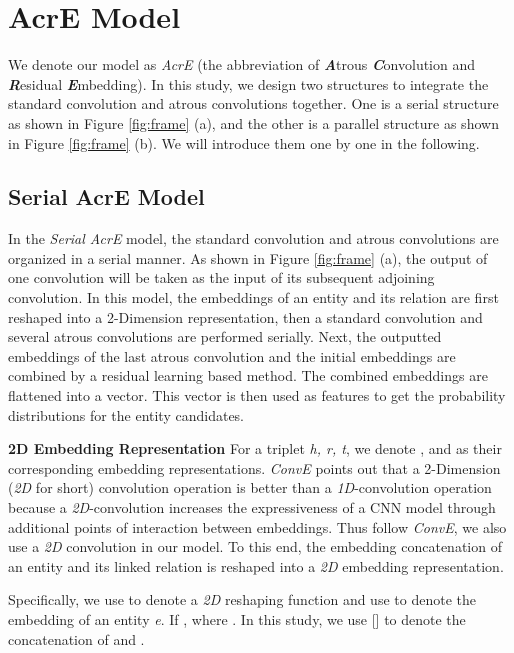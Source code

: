 \documentclass[11pt]{article}
\begin{document}
\section{AcrE Model}
We denote our model as \emph{AcrE} (the abbreviation of \textit{\textbf{A}}trous \textit{\textbf{C}}onvolution and \textit{\textbf{R}}esidual \textit{\textbf{E}}mbedding). In this study, we design  two structures to integrate the standard convolution and atrous convolutions together. One is a serial structure as shown in Figure \ref{fig:frame} (a), and the other is a parallel structure as shown in Figure \ref{fig:frame} (b). We will introduce them one by one in the following.  


\subsection{Serial AcrE Model}
In the \emph{Serial AcrE} model, the standard convolution and  atrous convolutions are organized in a serial manner. As shown in Figure \ref{fig:frame} (a),  the output of one convolution will be taken as the input of its subsequent adjoining  convolution. In this model, the embeddings of an entity and its relation are first reshaped into a 2-Dimension representation, then a standard convolution and several atrous convolutions are performed serially.  Next, the outputted embeddings  of the last atrous convolution and the initial embeddings are combined by a residual learning based method. The combined  embeddings are flattened into a vector. This vector  is then used as features to get the probability distributions for the entity candidates.

\noindent\textbf{2D Embedding Representation} For a triplet \emph{h, r, t}, we denote ,  and  as their corresponding embedding representations. \emph{ConvE}  points out that a 2-Dimension (\emph{2D} for short) convolution operation is better than a \emph{1D}-convolution operation because a \emph{2D}-convolution increases the expressiveness of a CNN model through additional points of interaction between embeddings. Thus follow \emph{ConvE}, we also use a \emph{2D} convolution in our model. To this end, the embedding concatenation of an entity  and its linked relation  is reshaped into a \emph{2D} embedding representation. 

Specifically, we use   to denote a \emph{2D} reshaping function and use  to denote the embedding of an entity \emph{e}. If ,    where . In this study, we use [] to denote the concatenation of   and . 
\end{document}
